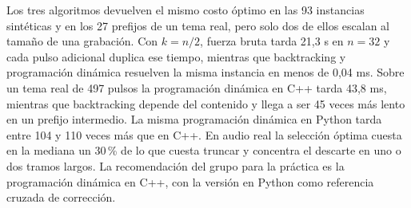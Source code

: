 Los tres algoritmos devuelven el mismo costo óptimo en las 93 instancias sintéticas y en los 27 prefijos de un tema real, pero solo dos de ellos escalan al tamaño de una grabación. Con $k = n/2$, fuerza bruta tarda 21,3 s en $n = 32$ y cada pulso adicional duplica ese tiempo, mientras que backtracking y programación dinámica resuelven la misma instancia en menos de 0,04 ms. Sobre un tema real de 497 pulsos la programación dinámica en C++ tarda 43,8 ms, mientras que backtracking depende del contenido y llega a ser 45 veces más lento en un prefijo intermedio. La misma programación dinámica en Python tarda entre 104 y 110 veces más que en C++. En audio real la selección óptima cuesta en la mediana un 30\,\% de lo que cuesta truncar y concentra el descarte en uno o dos tramos largos. La recomendación del grupo para la práctica es la programación dinámica en C++, con la versión en Python como referencia cruzada de corrección.
